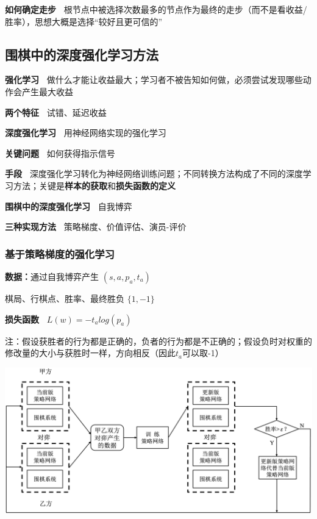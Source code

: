 \documentclass[b4paper, 10pt]{ctexart}
\makeatletter
\newenvironment{figurehere}
{\def\@captype{figure}}
{}
\makeatother
\begin{document}
\begin{multicols}{3}
\textbf{如何确定走步\ } 根节点中被选择次数最多的节点作为最终的走步（而不是看收益/胜率），思想大概是选择“较好且更可信的”

\subsection{围棋中的深度强化学习方法}
\textbf{强化学习\ } 做什么才能让收益最大；学习者不被告知如何做，必须尝试发现哪些动作会产生最大收益

\textbf{两个特征\ } 试错、延迟收益 

\textbf{深度强化学习\ } 用神经网络实现的强化学习

\textbf{关键问题\ } 如何获得指示信号

\textbf{手段\ } 深度强化学习转化为神经网络训练问题；不同转换方法构成了不同的深度学习方法；关键是\textbf{样本的获取}和\textbf{损失函数的定义}

\textbf{围棋中的深度强化学习\ } 自我博弈

\textbf{三种实现方法\ } 策略梯度、价值评估、演员-评价

\subsubsection{基于策略梯度的强化学习}

\textbf{数据：}通过自我博弈产生 $(s,a,p_a,t_a)$

\quad 棋局、行棋点、胜率、最终胜负 $\{1,-1\}$

\textbf{损失函数\ } $L(w)=-t_a log(p_a)$

注：假设获胜者的行为都是正确的，负者的行为都是不正确的；假设负时对权重的修改量的大小与获胜时一样，方向相反（因此$t_a$可以取-1）

\begin{figurehere}
    \centering    \includegraphics[width=0.95\linewidth]{figs/RL.png}
    \label{fig:AlphaGo-RL}
\end{figurehere}


\end{multicols}
\end{document}
